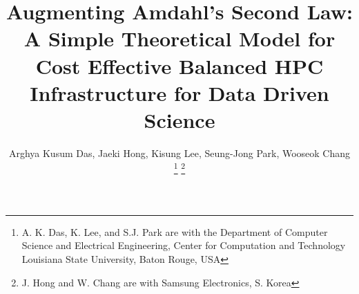\documentclass[journal]{IEEEtran}
\begin{document}
%
\title{Augmenting Amdahl's Second Law:  A Simple Theoretical Model for Cost Effective Balanced HPC Infrastructure for Data Driven Science}
%
%
%

\author{
Arghya Kusum Das, %
Jaeki Hong, 
Kisung Lee, %
Seung-Jong Park, %
Wooseok Chang\\
\thanks{A. K. Das, K. Lee, and S.J. Park are with the Department
of Computer Science and Electrical Engineering, Center for Computation and Technology Louisiana State University, Baton Rouge, USA}
\thanks{J. Hong and W. Chang are with Samsung Electronics, S. Korea}
}

% 
%
\end{document}
